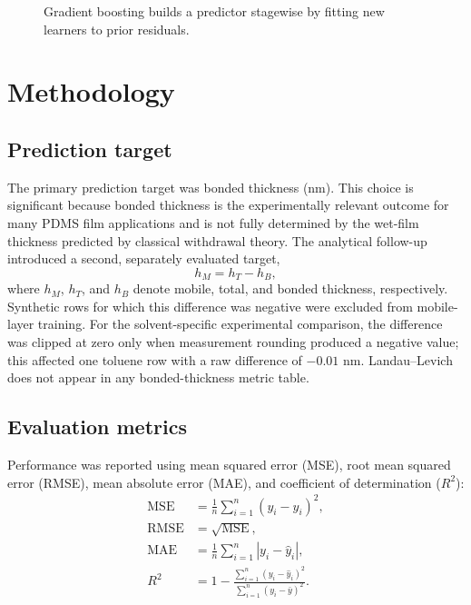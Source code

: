 \documentclass[11pt]{article}
\begin{document}
\begin{figure}[H]
\centering
{}
\caption{Gradient boosting builds a predictor stagewise by fitting new learners to prior residuals.}
\end{figure}

\section{Methodology}

\subsection{Prediction target}
The primary prediction target was bonded thickness (nm). This choice is significant because bonded thickness is the experimentally relevant outcome for many PDMS film applications and is not fully determined by the wet-film thickness predicted by classical withdrawal theory. The analytical follow-up introduced a second, separately evaluated target,
\begin{equation}
h_M = h_T-h_B,
\end{equation}
where $h_M$, $h_T$, and $h_B$ denote mobile, total, and bonded thickness, respectively. Synthetic rows for which this difference was negative were excluded from mobile-layer training. For the solvent-specific experimental comparison, the difference was clipped at zero only when measurement rounding produced a negative value; this affected one toluene row with a raw difference of $-0.01$ nm. Landau--Levich does not appear in any bonded-thickness metric table.

\subsection{Evaluation metrics}
Performance was reported using mean squared error (MSE), root mean squared error (RMSE), mean absolute error (MAE), and coefficient of determination ($R^2$):
\begin{align}
\mathrm{MSE} &= \frac{1}{n}\sum_{i=1}^{n}(y_i-\hat{y}_i)^2, \\
\mathrm{RMSE} &= \sqrt{\mathrm{MSE}}, \\
\mathrm{MAE} &= \frac{1}{n}\sum_{i=1}^{n}|y_i-\hat{y}_i|, \\
R^2 &= 1 - \frac{\sum_{i=1}^{n}(y_i-\hat{y}_i)^2}{\sum_{i=1}^{n}(y_i-\bar{y})^2}.
\end{align}
\end{document}
